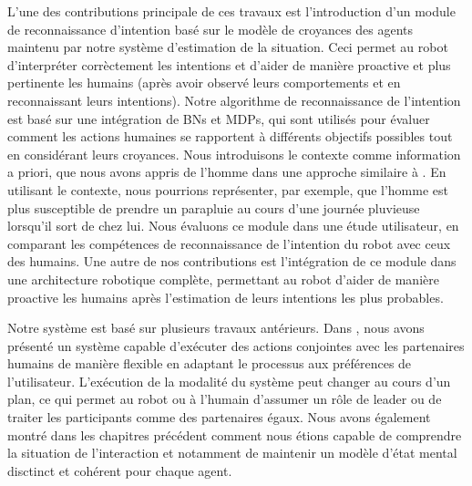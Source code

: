 \documentclass[a4paper,11pt,twoside]{StyleThese}
\begin{document}
L'une des contributions principale de ces travaux est l'introduction d'un module de reconnaissance d'intention basé sur le modèle de croyances des agents maintenu par notre système d'estimation de la situation. Ceci permet au robot d'interpréter corrèctement les intentions et d'aider de manière proactive et plus pertinente les humains (après avoir observé leurs comportements et en reconnaissant leurs intentions).
Notre algorithme de reconnaissance de l'intention est basé sur une intégration de BNs et MDPs, qui sont utilisés pour évaluer comment les actions humaines se rapportent à différents objectifs possibles tout en considérant leurs croyances. Nous introduisons le contexte comme information a priori, que nous avons appris de l'homme dans une approche similaire à \cite{Liu2014}. En utilisant le contexte, nous pourrions représenter, par exemple, que l'homme est plus susceptible de prendre un parapluie au cours d'une journée pluvieuse lorsqu'il sort de chez lui. Nous évaluons ce module dans une étude utilisateur, en comparant les compétences de reconnaissance de l'intention du robot avec ceux des humains. Une autre de nos contributions est l'intégration de ce module dans une architecture robotique complète, permettant au robot d'aider de manière proactive les humains après l'estimation de leurs intentions les plus probables.

Notre système est basé sur plusieurs travaux antérieurs. Dans \cite{fioreiser2014}, nous avons présenté un système capable d'exécuter des actions conjointes avec les partenaires humains de manière flexible en adaptant le processus aux préférences de l'utilisateur. L'exécution de la modalité du système peut changer au cours d'un plan, ce qui permet au robot ou à l'humain d'assumer un rôle de leader ou de traiter les participants comme des partenaires égaux. Nous avons également montré dans les chapitres précédent comment nous étions capable de comprendre la situation de l'interaction et notamment de maintenir un modèle d'état mental disctinct et cohérent pour chaque agent.

\end{document}
